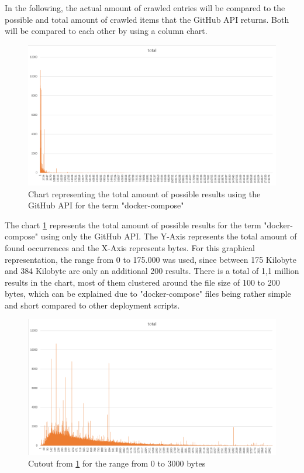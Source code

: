 In the following, the actual amount of crawled entries will be compared to the possible and total amount of crawled items that the GitHub API returns. Both will be compared to each other by using a column chart.

\begin{figure}[H]
    \centering
    \includegraphics[scale=0.5]{graphics/stats_total.png}
    \caption{Chart representing the total amount of possible results using the GitHub API for the term "docker-compose"}
    \label{fig:stats_total}
\end{figure}

The chart \ref{fig:stats_total} represents the total amount of possible results for the term "docker-compose" using only the GitHub API. The Y-Axis represents the total amount of found occurrences and the X-Axis represents bytes. For this graphical representation, the range from 0 to 175.000 was used, since between 175 Kilobyte and 384 Kilobyte are only an additional 200 results. There is a total of 1,1 million results in the chart, most of them clustered around the file size of 100 to 200 bytes, which can be explained due to "docker-compose" files being rather simple and short compared to other deployment scripts. 

\begin{figure}[H]
    \centering
    \includegraphics[scale=0.5]{graphics/stats_range.png}
    \caption{Cutout from \ref{fig:stats_total} for the range from 0 to 3000 bytes }
    \label{fig:stats_range}
\end{figure}

